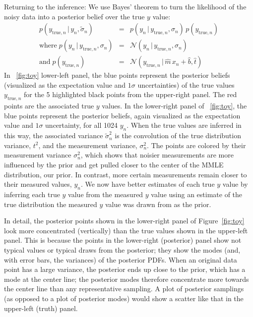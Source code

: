 \documentclass[modern]{aastex61}
\newcommand{\given}{\,|\,}
\newcommand{\true}{\mathrm{true}}
\begin{document}
Returning to the inference:
We use Bayes' theorem to turn the likelihood of the noisy data into a posterior belief over the true $y$ value:
\begin{eqnarray}
p(y_{\true,n} \given y_n, \tilde{\sigma}_n) &=& p(y_n \given y_{\true,n}, \sigma_n)\,p(y_{\true,n}) \\
\mathrm{where}\;p(y_n \given y_{\true,n}, \sigma_n) &=& \mathcal{N}(y_n \given y_{\true,n}, \sigma_n) \\
\mathrm{and}\;p(y_{\true,n}) &=& \mathcal{N}(y_{\true,n} \given \hat{m}\, x_n + \hat{b}, \hat{t})
\label{eq:toyBayes}
\end{eqnarray}
In \figurename~\ref{fig:toy} lower-left panel, the blue points represent the posterior beliefs (visualized as the expectation value and $1\sigma$ uncertainties) of the true values $y_{\true,n}$ for the 5 highlighted black points from the upper-right panel. The red points are the associated true $y$ values.
In the lower-right panel of \figurename~\ref{fig:toy}, the blue points represent the posterior beliefs, again visualized as the expectation value and $1\sigma$ uncertainty, for all 1024 $y_n$.
When the true values are inferred in this way, the associated variance $\tilde{\sigma}_n^2$ is the convolution of the true distribution variance, $t^2$, and the measurement variance, $\sigma_n^2$.
The points are colored by their measurement variance $\sigma_n^2$, which shows that noisier measurements are more influenced by the prior and get pulled closer to the center of the MMLE distribution, our prior. In contrast, more certain measurements remain closer to their measured values, $y_n$. We now have better estimates of each true $y$ value by inferring each true $y$ value from the measured $y$ value using an estimate of the true distribution the measured $y$ value was drawn from as the prior.

In detail, the posterior points shown in the lower-right panel of
Figure~\ref{fig:toy} look more concentrated (vertically) than the true
values shown in the upper-left panel.
This is because the points in the lower-right (posterior) panel show
not typical values or typical draws from the posterior; they show the
modes (and, with error bars, the variances) of the posterior PDFs.
When an original data point has a large variance, the posterior ends
up close to the prior, which has a mode at the center line; the
posterior modes therefore concentrate more towards the center line
than any representative sampling.
A plot of posterior samplings (as opposed to a plot of posterior modes) would
show a scatter like that in the upper-left (truth) panel.
\end{document}
